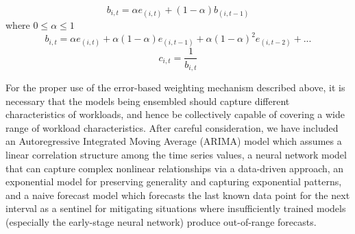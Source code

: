 \begin{equation} \label{eq:1}
b_{i,t}= \alpha e_{(i,t)} + (1-\alpha)b_{(i,t-1)}
\end{equation}
where $0\leq \alpha \leq 1$
\begin{equation}\nonumber
b_{i,t}=\alpha e_{(i,t)} + \alpha(1-\alpha)e_{(i,t-1)}+\alpha(1-\alpha)^2e_{(i,t-2)}+ . ..  
\end{equation}
\begin{equation}
c_{i,t}=\frac{1}{b_{i,t}} 
\end{equation}

For the proper use of the error-based weighting mechanism described above, it is necessary that the models being ensembled should capture different characteristics of workloads, and hence be collectively capable of covering a wide range of workload characteristics. After careful consideration, we have included an Autoregressive Integrated Moving Average (ARIMA) model which assumes a linear correlation structure among the time series values, a neural network model that can capture complex nonlinear relationships via a data-driven approach, an exponential model for preserving generality and capturing exponential patterns, and a naive forecast model which forecasts the last known data point for the next interval as a sentinel for mitigating situations where insufficiently trained models (especially the early-stage neural network) produce out-of-range forecasts.\\